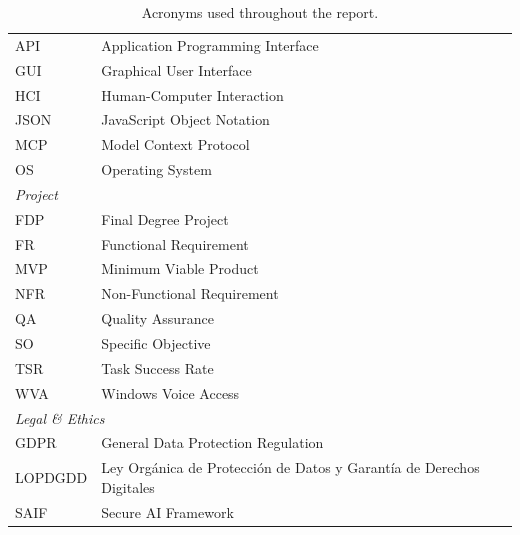 \begin{table}[H]
\begin{tabular*}{\textwidth}{@{\extracolsep{\fill}}ll@{}}
        API     & Application Programming Interface \\
        GUI     & Graphical User Interface \\
        HCI     & Human-Computer Interaction \\
        JSON    & JavaScript Object Notation \\
        MCP     & Model Context Protocol \\
        OS      & Operating System \\
        \midrule
        \multicolumn{2}{l}{\textit{Project}} \\
        \midrule
        FDP     & Final Degree Project \\
        FR      & Functional Requirement \\
        MVP     & Minimum Viable Product \\
        NFR     & Non-Functional Requirement \\
        QA      & Quality Assurance \\
        SO      & Specific Objective \\
        TSR     & Task Success Rate \\
        WVA     & Windows Voice Access \\
        \midrule
        \multicolumn{2}{l}{\textit{Legal \& Ethics}} \\
        \midrule
        GDPR    & General Data Protection Regulation \\
        LOPDGDD & Ley Orgánica de Protección de Datos y Garantía de Derechos Digitales \\
        SAIF    & Secure AI Framework \\
        \bottomrule
    \end{tabular*}
    \captionsetup{list=no}
    \caption{Acronyms used throughout the report.}
\end{table}
